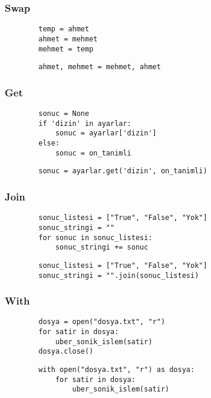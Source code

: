 \documentclass[10pt, compress]{beamer}
\begin{document}
\begin{frame}[fragile]
\frametitle{Swap}    
    \begin{verbatim}
        temp = ahmet
        ahmet = mehmet
        mehmet = temp
    \end{verbatim}
    
    \begin{verbatim}
        ahmet, mehmet = mehmet, ahmet
    \end{verbatim}    
\end{frame}

\begin{frame}[fragile]
\frametitle{Get}    
    \begin{verbatim}
        sonuc = None
        if 'dizin' in ayarlar:
            sonuc = ayarlar['dizin']
        else:
            sonuc = on_tanimli
    \end{verbatim}
    
    \begin{verbatim}
        sonuc = ayarlar.get('dizin', on_tanimli)
    \end{verbatim}    
\end{frame}

\begin{frame}[fragile]
\frametitle{Join}    
    \begin{verbatim}
        sonuc_listesi = ["True", "False", "Yok"]
        sonuc_stringi = ""
        for sonuc in sonuc_listesi:
            sonuc_stringi += sonuc
    \end{verbatim}
    
    \begin{verbatim}
        sonuc_listesi = ["True", "False", "Yok"]
        sonuc_stringi = "".join(sonuc_listesi)
    \end{verbatim}    
\end{frame}

\begin{frame}[fragile]
\frametitle{With}    
    \begin{verbatim}
        dosya = open("dosya.txt", "r")
        for satir in dosya:
            uber_sonik_islem(satir)
        dosya.close()
    \end{verbatim}
    
    \begin{verbatim}
        with open("dosya.txt", "r") as dosya:
            for satir in dosya:
                uber_sonik_islem(satir)
    \end{verbatim} 
\end{frame}
\end{document}
